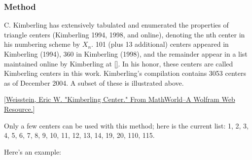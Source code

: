 
\subsubsection{Method } %
\label{ssub:method_imeth_triangle_kimberling}

C. Kimberling has extensively tabulated and enumerated the properties of triangle centers (Kimberling 1994, 1998, and online), denoting the nth center in his numbering scheme by $X_n$. 101 (plus 13 additional) centers appeared in Kimberling (1994), 360 in Kimberling (1998), and the remainder appear in a list maintained online by Kimberling at [\href{http://faculty.evansville.edu/ck6/encyclopedia/ETC.html}]. In his honor, these centers are called Kimberling centers in this work. Kimberling's compilation contains 3053 centers as of December 2004. A subset of these is illustrated above.

[\href{https://mathworld.wolfram.com/KimberlingCenter.html}{Weisstein, Eric W. "Kimberling Center." From MathWorld--A Wolfram Web Resource.}]

Only a few centers can be used with this method; here is the current list: 1, 2, 3, 4, 5, 6, 7, 8, 9, 10, 11, 12, 13, 14, 19, 20, 110, 115.

Here's an example:

